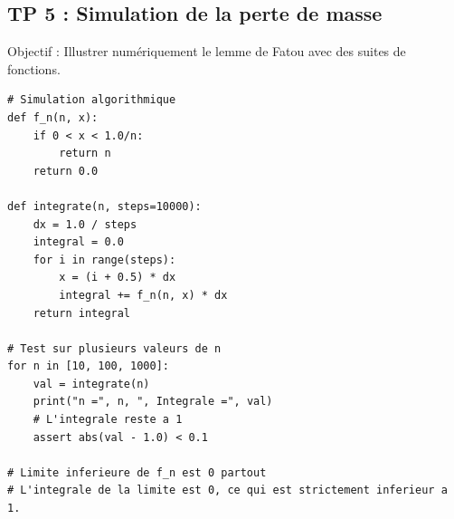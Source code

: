 \documentclass[11pt,a4paper]{article}
\begin{document}
\subsection*{TP 5 : Simulation de la perte de masse}
Objectif : Illustrer numériquement le lemme de Fatou avec des suites de fonctions.

\begin{lstlisting}
# Simulation algorithmique
def f_n(n, x):
    if 0 < x < 1.0/n:
        return n
    return 0.0

def integrate(n, steps=10000):
    dx = 1.0 / steps
    integral = 0.0
    for i in range(steps):
        x = (i + 0.5) * dx
        integral += f_n(n, x) * dx
    return integral

# Test sur plusieurs valeurs de n
for n in [10, 100, 1000]:
    val = integrate(n)
    print("n =", n, ", Integrale =", val)
    # L'integrale reste a 1
    assert abs(val - 1.0) < 0.1

# Limite inferieure de f_n est 0 partout
# L'integrale de la limite est 0, ce qui est strictement inferieur a 1.
\end{lstlisting}
\end{document}

